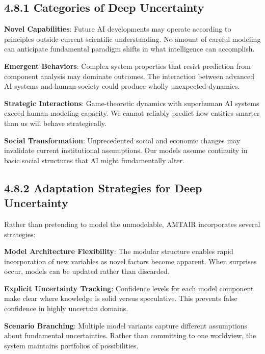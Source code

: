 \documentclass[
  11pt,
  letterpaper,
]{book}
\begin{document}
\subsection*{4.8.1 Categories of Deep
Uncertainty}\label{sec-uncertainty-categories}

\textbf{Novel Capabilities}: Future AI developments may operate
according to principles outside current scientific understanding. No
amount of careful modeling can anticipate fundamental paradigm shifts in
what intelligence can accomplish.

\textbf{Emergent Behaviors}: Complex system properties that resist
prediction from component analysis may dominate outcomes. The
interaction between advanced AI systems and human society could produce
wholly unexpected dynamics.

\textbf{Strategic Interactions}: Game-theoretic dynamics with superhuman
AI systems exceed human modeling capacity. We cannot reliably predict
how entities smarter than us will behave strategically.

\textbf{Social Transformation}: Unprecedented social and economic
changes may invalidate current institutional assumptions. Our models
assume continuity in basic social structures that AI might fundamentally
alter.

\subsection*{4.8.2 Adaptation Strategies for Deep
Uncertainty}\label{sec-adaptation-strategies}

Rather than pretending to model the unmodelable, AMTAIR incorporates
several strategies:

\textbf{Model Architecture Flexibility}: The modular structure enables
rapid incorporation of new variables as novel factors become apparent.
When surprises occur, models can be updated rather than discarded.

\textbf{Explicit Uncertainty Tracking}: Confidence levels for each model
component make clear where knowledge is solid versus speculative. This
prevents false confidence in highly uncertain domains.

\textbf{Scenario Branching}: Multiple model variants capture different
assumptions about fundamental uncertainties. Rather than committing to
one worldview, the system maintains portfolios of possibilities.
\end{document}
